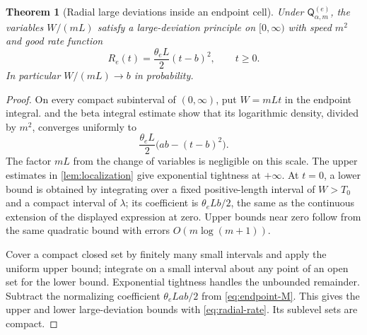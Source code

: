 \documentclass[11pt,a4paper]{article}
\numberwithin{equation}{section}
\newtheorem{theorem}{Theorem}[section]
\theoremstyle{definition}\newaliascnt{definition}{theorem}
\theoremstyle{remark}\newaliascnt{remark}{theorem}
\begin{document}
\begin{theorem}[Radial large deviations inside an endpoint cell]
\label{thm:radial-LDP}
Under $\mathsf Q_{\alpha,m}^{(e)}$, the variables
$W/(mL)$ satisfy a large-deviation principle on $[0,\infty)$ with speed
$m^2$ and good rate function
\begin{equation}
 R_e(t)=\frac{\theta_eL}{2}(t-b)^2,
 \qquad t\ge0.
 \label{eq:radial-rate}
\end{equation}
In particular $W/(mL)\to b$ in probability.
\end{theorem}
\begin{proof}
On every compact subinterval of $(0,\infty)$, put $W=mLt$ in the
endpoint integral.  and the beta integral
estimate show that its logarithmic density, divided by $m^2$, converges
uniformly to
\[
 \frac{\theta_eL}{2}\bigl(ab-(t-b)^2\bigr).
\]
The factor $mL$ from the change of variables is negligible on this scale.
The upper estimates in \cref{lem:localization} give exponential tightness
at $+\infty$. At $t=0$, a lower bound is obtained by integrating over a
fixed positive-length interval of $W>T_0$ and a compact interval of
$\lambda$; its coefficient is $\theta_eLb/2$, the same as the continuous
extension of the displayed expression at zero. Upper bounds near zero
follow from the same quadratic bound with errors $O(m\log(m+1))$.

Cover a compact closed set by finitely many small intervals and apply the
uniform upper bound; integrate on a small interval about any point of an
open set for the lower bound. Exponential tightness handles the unbounded
remainder. Subtract the normalizing coefficient $\theta_eLab/2$ from
\eqref{eq:endpoint-M}. This gives the upper and lower large-deviation
bounds with \eqref{eq:radial-rate}. Its sublevel sets are compact.
\end{proof}
\end{document}
